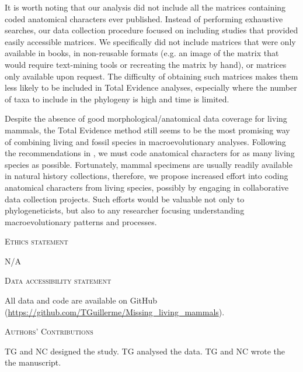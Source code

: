 \documentclass[12pt,letterpaper]{article}
\renewcommand{\section}[1]{%
\bigskip
\begin{center}
\begin{Large}
\normalfont\scshape #1
\medskip
\end{Large}
\end{center}}
\begin{document}
It is worth noting that our analysis did not include all the matrices containing coded anatomical characters ever published.
Instead of performing exhaustive searches, our data collection procedure focused on including studies that provided easily accessible matrices.
We specifically did not include matrices that were only available in books, in non-reusable formats (e.g. an image of the matrix that would require text-mining tools or recreating the matrix by hand), or matrices only available upon request.
The difficulty of obtaining such matrices makes them less likely to be included in Total Evidence analyses, especially where the number of taxa to include in the phylogeny is high and time is limited.

Despite the absence of good morphological/anatomical data coverage for living mammals, %
 the Total Evidence method still seems to be the most promising way of combining living and fossil species in macroevolutionary analyses.
Following the recommendations in \cite{GuillermeCooper}, we must code anatomical characters for as many living species as possible. 
Fortunately, mammal specimens are usually readily available in natural history collections, therefore, we propose increased effort into coding anatomical characters from living species, possibly by engaging in collaborative data collection projects.
Such efforts would be valuable not only to phylogeneticists, but also to any researcher focusing understanding macroevolutionary patterns and processes.

\section{Ethics statement}
N/A
\section{Data accessibility statement}
All data and code are available on GitHub (\url{https://github.com/TGuillerme/Missing_living_mammals}).
\section{Authors' Contributions}
TG and NC designed the study. TG analysed the data. TG and NC wrote the the manuscript.
\end{document}
